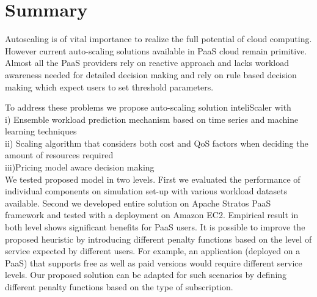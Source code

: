 \section{Summary}

Autoscaling is of vital importance to realize the full potential of cloud computing. However current auto-scaling solutions available in PaaS cloud remain primitive. Almost all the PaaS providers rely on reactive approach and lacks workload awareness needed for detailed decision making and rely on rule based decision making which expect users to set threshold parameters. 

To address these problems we propose auto-scaling solution inteliScaler with\\
i)  Ensemble workload prediction mechanism based on time series and machine learning techniques \\ 
ii) Scaling algorithm that considers both cost and QoS factors when deciding the amount of resources required\\
iii)Pricing model aware decision making\\

We tested proposed model in two levels. First we evaluated the performance of individual components on simulation set-up with various workload datasets available. Second we developed entire solution on Apache Stratos PaaS framework and tested with a deployment on Amazon EC2. Empirical result in both level shows significant benefits for PaaS users. It is possible to improve the proposed heuristic by introducing different penalty functions  based on the level of service expected by different users. For example, an application (deployed on a PaaS) that supports free as well as paid versions would require different service levels. Our proposed solution can be adapted for such scenarios by defining different penalty functions based on the type of subscription.



